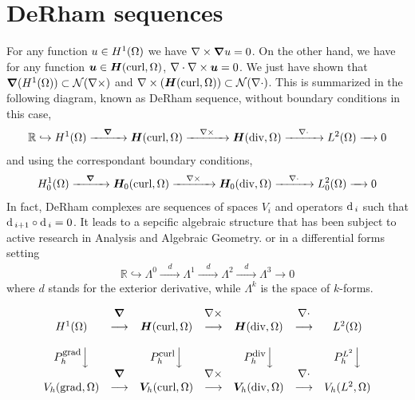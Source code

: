 \section{DeRham sequences}
For any function $u \in H^1(\Omega)$ we have $\nabla \times \boldsymbol{\nabla} u = 0$. On the other hand, we have for any function $\bm{u} \in \bm{H}(\mbox{curl}, \Omega)$, $\nabla \cdot \nabla \times \bm{u} = 0$. We just have shown that $\boldsymbol{\nabla}(H^1(\Omega)) \subset \mathcal{N}(\nabla \times)$ and $\nabla \times(\bm{H}(\mbox{curl}, \Omega)) \subset \mathcal{N}(\nabla \cdot)$. This is summarized in the following diagram, known as DeRham sequence, without boundary conditions in this case,
%
\begin{align}
  \mathbb{R} \hookrightarrow H^1(\Omega)  \xrightarrow{\quad \boldsymbol{\nabla} \quad}  \bm{H}(\mbox{curl}, \Omega)  \xrightarrow{\quad \nabla \times \quad}   \bm{H}(\mbox{div}, \Omega)  \xrightarrow{\quad \nabla \cdot \quad}  L^2(\Omega)  \xrightarrow{\quad} 0  
  \label{eq:derham-nobc}
\end{align}
and using the correspondant boundary conditions,
\begin{align}
  H^1_0(\Omega)  \xrightarrow{\quad \boldsymbol{\nabla} \quad}  \bm{H}_0(\mbox{curl}, \Omega)  \xrightarrow{\quad \nabla \times \quad}   \bm{H}_0(\mbox{div}, \Omega)  \xrightarrow{\quad \nabla \cdot \quad}  L^2_0(\Omega)  \xrightarrow{\quad} 0  
  \label{eq:derham-bc}
\end{align}
%
In fact, DeRham complexes are sequences of spaces $V_i$ and operators $\mathrm{d}\,_i$ such that $\mathrm{d}\,_{i+1} \circ \mathrm{d}\,_i = 0$. It leads to a sepcific algebraic structure that has been subject to active research in Analysis and Algebraic Geometry.
or in a differential forms setting
%
\begin{align}
\mathbb{R} \hookrightarrow \Lambda^0  \xrightarrow{\quad d \quad}  \Lambda^1  \xrightarrow{\quad d \quad} \Lambda^2  \xrightarrow{\quad d \quad}  \Lambda^3 \xrightarrow{\quad} 0 
\end{align}
%
where $d$ stands for the exterior derivative, while $\Lambda^k$ is the space of $k$-forms.

\begin{equation*}
\begin{array}{ccccccc}
            & \Grad &                 & \Curl &                    & \Div   &             \\
\Hgrad & \longrightarrow & \Hcurl & \longrightarrow  & \Hdiv & \longrightarrow & \Ltwo    \\
            &       &                 &       &                    &        &             \\
\Pigrad \Big\downarrow   &     & \Picurl \Big\downarrow  &   & \Pidiv \Big\downarrow &  & \Piltwo \Big\downarrow       \\
            & \Grad &                 & \Curl &                    & \Div   &             \\
\Vgrad &\longrightarrow  & \Vcurl &\longrightarrow   & \Vdiv & \longrightarrow & \Vltwo   \\
%
\\
\end{array}
\end{equation*}

